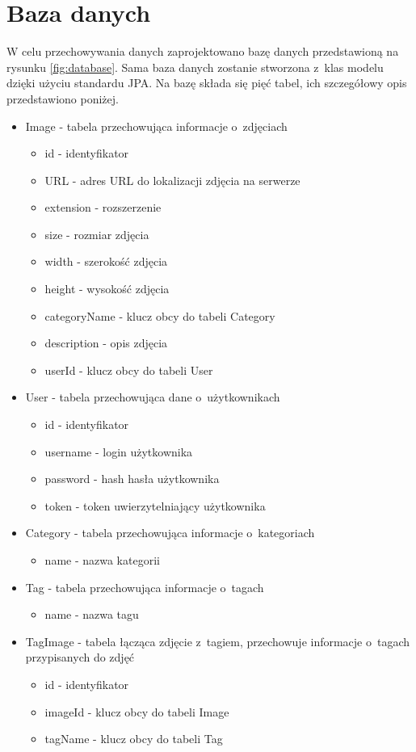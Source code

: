 \section{Baza danych}
W celu przechowywania danych zaprojektowano bazę danych przedstawioną na rysunku \ref{fig:database}. Sama baza danych zostanie stworzona z~klas modelu dzięki użyciu standardu JPA. Na bazę składa się pięć tabel, ich szczegółowy opis przedstawiono poniżej.
\begin{itemize}
	\item Image - tabela przechowująca informacje o~zdjęciach
	\begin{itemize}
		\item id - identyfikator
		\item URL - adres URL do lokalizacji zdjęcia na serwerze
		\item extension - rozszerzenie
		\item size - rozmiar zdjęcia
		\item width - szerokość zdjęcia
        \item height - wysokość zdjęcia
        \item categoryName - klucz obcy do tabeli Category
        \item description - opis zdjęcia
        \item userId - klucz obcy do tabeli User
	\end{itemize}
	\item User - tabela przechowująca dane o~użytkownikach
	\begin{itemize}
		\item id - identyfikator
		\item username - login użytkownika
		\item password - hash hasła użytkownika
		\item token - token uwierzytelniający użytkownika
	\end{itemize}
	\item Category - tabela przechowująca informacje o~kategoriach
	\begin{itemize}
		\item name - nazwa kategorii
	\end{itemize}
    \item Tag - tabela przechowująca informacje o~tagach
    \begin{itemize}
        \item name - nazwa tagu
    \end{itemize}
	\item TagImage - tabela łącząca zdjęcie z~tagiem, przechowuje informacje o~tagach przypisanych do zdjęć
	\begin{itemize}
		\item id - identyfikator
		\item imageId - klucz obcy do tabeli Image
		\item tagName - klucz obcy do tabeli Tag
	\end{itemize}
\end{itemize}

